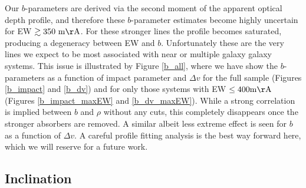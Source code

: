 \documentclass[twocolumn,tighten]{aastex62}
\begin{document}
Our $b$-parameters are derived via the second moment of the apparent optical depth profile, and therefore these $b$-parameter estimates become highly uncertain for EW $\rm \gtrsim 350~m\AA$. For these stronger lines the profile becomes saturated, producing a degeneracy between EW and $b$. Unfortunately these are the very lines we expect to be most associated with near or multiple galaxy galaxy systems. This issue is illustrated by Figure \ref{b_all}, where we have show the $b$-parameters as a function of impact parameter and $\Delta v$  for the full sample (Figures \ref{b_impact} and \ref{b_dv}) and for only those systems with EW $\rm \leq 400 m\AA$ (Figures \ref{b_impact_maxEW} and \ref{b_dv_maxEW}). While a strong correlation is implied between $b$ and $\rho$ without any cuts, this completely disappears once the stronger absorbers are removed. A similar albeit less extreme effect is seen for $b$ as a function of $\Delta v$. A careful profile fitting analysis is the best way forward here, which we will reserve for a future work.




\subsection{Inclination}
\end{document}
